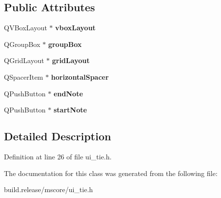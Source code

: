 \subsection*{Public Attributes}
\begin{DoxyCompactItemize}
\item 
\mbox{\label{class_ui___tie_base_a5bd3f26bc25ed5a3c18ceb8c62b9044c}} 
Q\+V\+Box\+Layout $\ast$ {\bfseries vbox\+Layout}
\item 
\mbox{\label{class_ui___tie_base_aa919ec2464697ad8daf7039a6aa7dcf3}} 
Q\+Group\+Box $\ast$ {\bfseries group\+Box}
\item 
\mbox{\label{class_ui___tie_base_aefc84c04806f63a5813c931e651f220d}} 
Q\+Grid\+Layout $\ast$ {\bfseries grid\+Layout}
\item 
\mbox{\label{class_ui___tie_base_ad93b238ed89e201cc3dd3bb3ab042357}} 
Q\+Spacer\+Item $\ast$ {\bfseries horizontal\+Spacer}
\item 
\mbox{\label{class_ui___tie_base_a38d2b880184d0271f087dcc54b00f767}} 
Q\+Push\+Button $\ast$ {\bfseries end\+Note}
\item 
\mbox{\label{class_ui___tie_base_af97362331c85e5fc826a9fe9b65fd1f3}} 
Q\+Push\+Button $\ast$ {\bfseries start\+Note}
\end{DoxyCompactItemize}


\subsection{Detailed Description}


Definition at line 26 of file ui\+\_\+tie.\+h.



The documentation for this class was generated from the following file\+:\begin{DoxyCompactItemize}
\item 
build.\+release/mscore/ui\+\_\+tie.\+h\end{DoxyCompactItemize}
